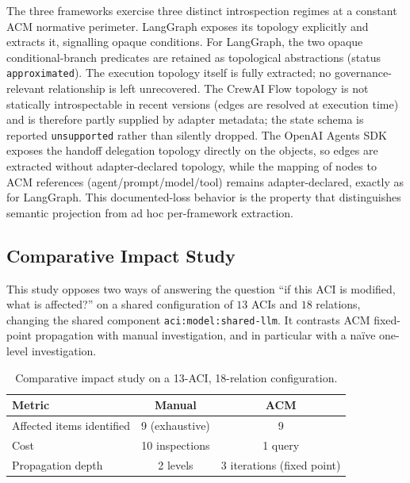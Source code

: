 \documentclass[10pt]{article}
\begin{document}
The three frameworks exercise three distinct introspection regimes at a
constant ACM normative perimeter. LangGraph exposes its topology
explicitly and extracts it, signalling opaque conditions. For LangGraph, the two opaque conditional-branch predicates are retained as topological abstractions (status \texttt{approximated}). The execution topology itself is fully extracted; no governance-relevant relationship is left unrecovered. The CrewAI Flow topology is not statically introspectable in recent versions (edges are resolved at execution time) and is therefore partly supplied by adapter metadata; the state schema is reported \texttt{unsupported} rather than silently dropped. The OpenAI Agents SDK exposes the handoff delegation topology directly on the objects, so edges are extracted without adapter-declared topology, while the mapping of nodes to ACM references (agent/prompt/model/tool) remains adapter-declared, exactly as for LangGraph. This documented-loss behavior is the property that distinguishes semantic projection from ad hoc per-framework extraction.

\subsection{Comparative Impact Study}
\label{app:report-impact-comparative}

This study opposes two ways of answering the question ``if this ACI is
modified, what is affected?'' on a shared configuration of $13$ ACIs and
$18$ relations, changing the shared component \texttt{aci:model:shared-llm}.
It contrasts ACM fixed-point propagation with manual investigation, and
in particular with a na\"ive one-level investigation.

\begin{table}[htbp]
	\centering
	\caption{Comparative impact study on a 13-ACI, 18-relation configuration.}
	\label{tab:app-impact-comparative}
	\small
	\begin{tabularx}{\columnwidth}{@{}Xcc@{}}
		\toprule
		\textbf{Metric} & \textbf{Manual} & \textbf{ACM} \\
		\midrule
		Affected items identified & 9 (exhaustive) & 9 \\
		Cost & 10 inspections & 1 query \\
		Propagation depth & 2 levels & 3 iterations (fixed point) \\
		\bottomrule
	\end{tabularx}
\end{table}
\end{document}
